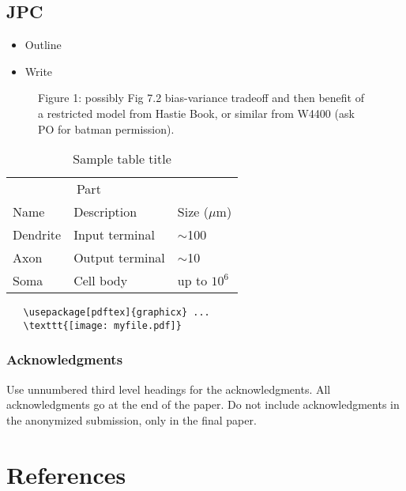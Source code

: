 \documentclass{article}
\begin{document}
\subsection{JPC}
\begin{itemize}
\item Outline
\item Write
\end{itemize}




\begin{figure}
  \centering
  \fbox{\rule[-.5cm]{0cm}{4cm} \rule[-.5cm]{4cm}{0cm}}
  \caption{Figure 1: possibly Fig 7.2 bias-variance tradeoff and then benefit of a restricted model from Hastie Book, or similar from W4400 (ask PO for batman permission).}
\end{figure}



\begin{table}
  \caption{Sample table title}
  \label{sample-table}
  \centering
  \begin{tabular}{lll}
    \toprule
    \multicolumn{2}{c}{Part}                   \\
    \cmidrule(r){1-2}
    Name     & Description     & Size ($\mu$m) \\
    \midrule
    Dendrite & Input terminal  & $\sim$100     \\
    Axon     & Output terminal & $\sim$10      \\
    Soma     & Cell body       & up to $10^6$  \\
    \bottomrule
  \end{tabular}
\end{table}


\begin{verbatim}
   \usepackage[pdftex]{graphicx} ...
   \texttt{[image: myfile.pdf]}
\end{verbatim}




\clearpage

\subsubsection*{Acknowledgments}

Use unnumbered third level headings for the acknowledgments. All
acknowledgments go at the end of the paper. Do not include
acknowledgments in the anonymized submission, only in the final paper.

\section*{References}
\end{document}
